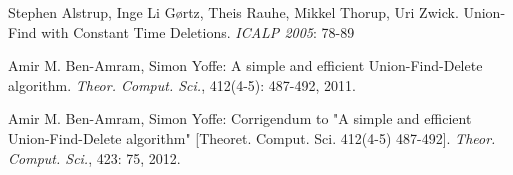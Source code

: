 \documentclass[a4paper,12pt, titlepage]{article}  %
\begin{document}
\begin{thebibliography}{99}
        Stephen Alstrup, Inge Li G\o rtz, Theis Rauhe, Mikkel Thorup, Uri Zwick. Union-Find with Constant Time Deletions. \emph{ICALP 2005}: 78-89

	Amir M. Ben-Amram, Simon Yoffe: A simple and efficient Union-Find-Delete algorithm. \emph{Theor. Comput. Sci.}, 412(4-5): 487-492, 2011.

        Amir M. Ben-Amram, Simon Yoffe: Corrigendum to "A simple and efficient Union-Find-Delete algorithm" [Theoret. Comput. Sci. 412(4-5) 487-492]. 
        \emph{Theor. Comput. Sci.}, 423: 75, 2012.

\end{thebibliography}
\end{document}
